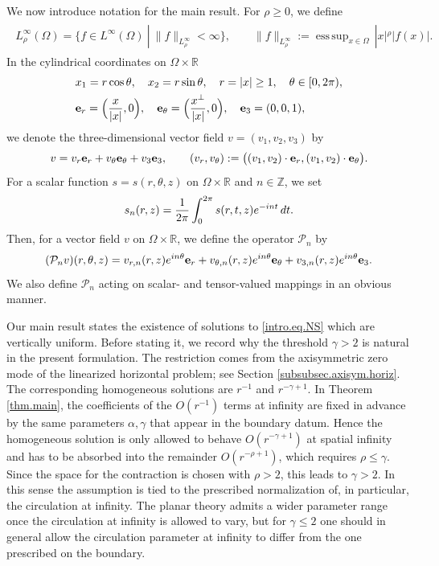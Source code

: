 \documentclass[11pt,a4paper]{article}
\numberwithin{equation}{section}
\newcommand{\Z}{\mathbb{Z}}
\newcommand{\R}{\mathbb{R}}
\newcommand{\dd}{\,{\rm d}}
\DeclareMathOperator*{\esssup}{ess\,sup}
\begin{document}
We now introduce notation for the main result. For $\rho\ge0$, we define 
%
\begin{align}\label{def.L^infty_rho}
\begin{split}
L^\infty_\rho(\Omega) = \{ f\in L^\infty(\Omega)~|~ 
\|f\|_{L^\infty_\rho} 
<\infty \}, \qquad
\|f\|_{L^\infty_\rho} := \esssup_{x\in\Omega}\, |x|^\rho |f(x)|. 
\end{split}
\end{align}
%
In the cylindrical coordinates on $\Omega\times\R$ 
%
\begin{align}\label{def.cyl.coord.}
\begin{split}
&x_1 = r\cos \theta, 
\quad
x_2 = r\sin \theta, 
\quad 
r= |x| \ge 1, \quad \theta\in [0,2\pi),\\
&
{\bf e}_r = \Big(\frac{x}{|x|}, 0\Big), 
\quad 
{\bf e}_\theta = \Big(\frac{x^\bot}{|x|}, 0\Big), 
\quad 
{\bf e}_3 = (0,0,1), 
\end{split}
\end{align}
%
we denote the three-dimensional vector field $v=(v_1,v_2,v_3)$ by 
\[
v 
= v_r {\bf e}_r 
+ v_\theta {\bf e}_\theta 
+ v_3 {\bf e}_3,
\qquad
(v_r, v_\theta)
:=
\big(
(v_1,v_2)\cdot {\bf e}_r, 
(v_1,v_2)\cdot {\bf e}_\theta 
\big). 
\]
For a scalar function $s=s(r,\theta,z)$ on $\Omega\times\R$ and $n\in\Z$, we set 
\[
s_n(r,z) 
= \frac{1}{2\pi} \int_{0}^{2\pi} s(r,t,z) e^{-int} \dd t. 
\]
Then, for a vector field $v$ on $\Omega\times\R$, we define the operator ${\mathcal P}_n$ by 
\[
({\mathcal P}_n v)(r,\theta,z) 
= v_{r,n}(r,z) e^{in\theta} {\bf e}_r 
+ v_{\theta,n}(r,z) e^{in\theta} {\bf e}_\theta 
+ v_{3,n}(r,z) e^{in\theta} {\bf e}_3. 
\]
We also define ${\mathcal P}_n$ acting on scalar- and tensor-valued mappings in an obvious manner. 


Our main result states the existence of solutions to \eqref{intro.eq.NS} which are vertically uniform. Before stating it, we record why the threshold $\gamma>2$ is natural in the present formulation. The restriction comes from the axisymmetric zero mode of the linearized horizontal problem; see Section \ref{subsubsec.axisym.horiz}. The corresponding homogeneous solutions are $r^{-1}$ and $r^{-\gamma+1}$. In Theorem \ref{thm.main}, the coefficients of the $O(r^{-1})$ terms at infinity are fixed in advance by the same parameters $\alpha,\gamma$ that appear in the boundary datum. Hence the homogeneous solution is only allowed to behave $O(r^{-\gamma+1})$ at spatial infinity and has to be absorbed into the remainder $O(r^{-\rho+1})$, which requires $\rho\le\gamma$. Since the space for the contraction is chosen with $\rho>2$, this leads to $\gamma>2$. In this sense the assumption is tied to the prescribed normalization of, in particular, the circulation at infinity. The planar theory \cite[Theorem 1]{GH2024} admits a wider parameter range once the circulation at infinity is allowed to vary, but for $\gamma\le2$ one should in general allow the circulation parameter at infinity to differ from the one prescribed on the boundary. 
\end{document}
